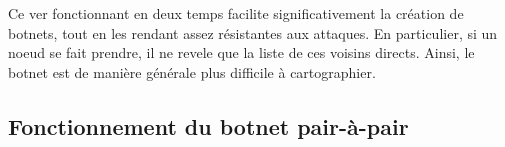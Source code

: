 Ce ver fonctionnant en deux temps facilite significativement la création de
botnets, tout en les rendant assez résistantes aux attaques. En particulier,
si un noeud se fait prendre, il ne revele que la liste de ces voisins directs.
Ainsi, le botnet est de manière générale plus difficile à cartographier.

\subsection{Fonctionnement du botnet pair-à-pair}
